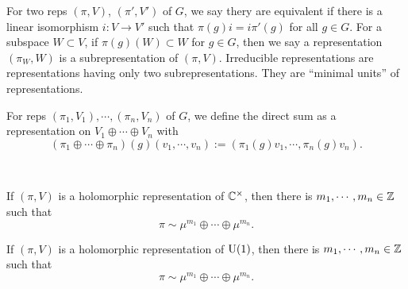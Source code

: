 \documentclass{../../small}
\begin{document}
\begin{defn}
For two reps $(\pi,V)$, $(\pi',V')$ of $G$, we say thery are equivalent if there is a linear isomorphism $i:V\to V'$ such that $\pi(g)i=i\pi'(g)$ for all $g\in G$.
For a subspace $W\subset V$, if $\pi(g)(W)\subset W$ for $g\in G$, then we say a representation $(\pi_W,W)$ is a subrepresentation of $(\pi,V)$.
Irreducible representations are representations having only two subrepresentations.
They are ``minimal units'' of representations.

For reps $(\pi_1,V_1),\cdots,(\pi_n,V_n)$ of $G$, we define the direct sum as a representation on $V_1\oplus\cdots\oplus V_n$ with
\[(\pi_1\oplus\cdots\oplus\pi_n)(g)(v_1,\cdots,v_n):=(\pi_1(g)v_1,\cdots,\pi_n(g)v_n).\]
\end{defn}
\begin{prop}\,
\begin{parts}
\item If $(\pi,V)$ is a holomorphic representation of $\mathbb{C}^\times$, then there is $m_1,\cdots,m_n\in\mathbb{Z}$ such that
\[\pi\sim\mu^{m_1}\oplus\cdots\oplus\mu^{m_n}.\]
\item If $(\pi,V)$ is a holomorphic representation of $\mathrm{U}(1)$, then there is $m_1,\cdots,m_n\in\mathbb{Z}$ such that
\[\pi\sim\mu^{m_1}\oplus\cdots\oplus\mu^{m_n}.\]
\end{parts}	
\end{prop} 
\end{document}
